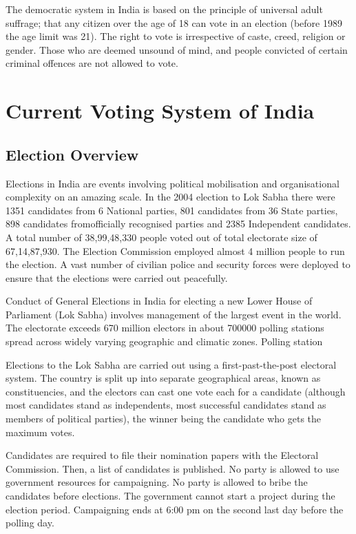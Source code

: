 \documentclass[12pt]{report}
\begin{document}
The democratic system in India is based on the principle of universal adult suffrage; that any citizen over the age of 18 can vote in an election (before 1989 the age limit was 21). The right to vote is irrespective of caste, creed, religion or gender. Those who are deemed unsound of mind, and people convicted of certain criminal offences are not allowed to vote. 

\section{Current Voting System of India}
\subsection{Election Overview}

Elections in India are events involving political mobilisation and organisational complexity on an amazing scale. In the 2004 election to Lok Sabha there were 1351 candidates from 6 National parties, 801 candidates from 36 State parties, 898 candidates fromofficially recognised parties and 2385 Independent candidates. A total number of 38,99,48,330 people voted out of total electorate size of 67,14,87,930. The Election Commission employed almost 4 million people to run the election. A vast number of civilian police and security forces were deployed to ensure that the elections were carried out peacefully.

Conduct of General Elections in India for electing a new Lower House of Parliament (Lok Sabha) involves management of the largest event in the world. The electorate exceeds 670 million electors in about 700000 polling stations spread across widely varying geographic and climatic zones. Polling station

Elections to the Lok Sabha are carried out using a first-past-the-post electoral system. The country is split up into separate geographical areas, known as constituencies, and the electors can cast one vote each for a candidate (although most candidates stand as independents, most successful candidates stand as members of political parties), the winner being the candidate who gets the maximum votes. 

Candidates are required to file their nomination papers with the Electoral Commission. Then, a list of candidates is published. No party is allowed to use government resources for campaigning. No party is allowed to bribe the candidates before elections. The government cannot start a project during the election period. Campaigning ends at 6:00 pm on the second last day before the polling day.
\end{document}
